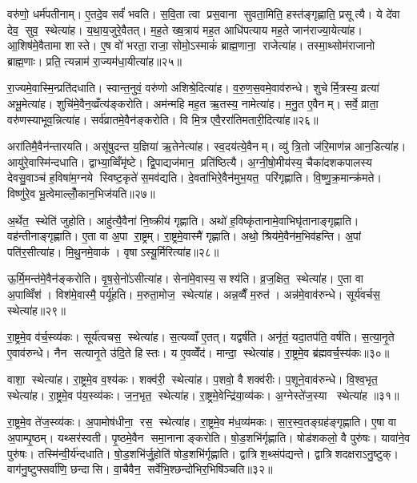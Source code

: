 वरु॑णो॒ धर्म॑पतीनाम्। ए॒तदे॒व सर्वं॑ भवति। स॒वि॒ता त्वा प्रस॒वाना सुवता॒मिति॒ हस्त॑ङ्गृह्णाति॒ प्रसूत्यै। ये दे॑वा देव॒ सुव॒ स्थेत्या॑ह। य॒था॒य॒जुरे॒वैतत्। म॒ह॒ते ख्ष॒त्राय॑ मह॒त आधि॑पत्याय मह॒ते जान॑राज्या॒येत्या॑ह। आ॒शिष॑मे॒वैतामा शास्ते। ए॒ष वो॑ भरता॒ राजा॒ सोमो॒ऽस्माकं॑ ब्राह्म॒णाना॒ राजेत्या॑ह। तस्मा॒थ्सोम॑राजानो ब्राह्म॒णाः। प्रति॒ त्यन्नाम॑ रा॒ज्यम॑धा॒यीत्या॑ह॥२५॥

रा॒ज्यमे॒वास्मि॒न्प्रति॑दधाति। स्वान्त॒नुवं॒ वरु॑णो अशिश्रे॒दित्या॑ह। व॒रु॒ण॒स॒वमे॒वाव॑रुन्धे। शुचेर्मि॒त्रस्य॒ व्रत्या॑ अभू॒मेत्या॑ह। शुचि॑मे॒वैन॒व्व्रँत्य॑ङ्करोति। अम॑न्महि मह॒त ऋ॒तस्य॒ नामेत्या॑ह। म॒नु॒त ए॒वैनम्। सर्वे॒ व्राता॒ वरु॑णस्याभूव॒न्नित्या॑ह। सर्व॑व्रातमे॒वैन॑ङ्करोति। वि मि॒त्र एवै॒ररा॑तिमतारी॒दित्या॑ह॥२६॥

अरा॑तिमै॒वैन॑न्तारयति। असू॑षुदन्त य॒ज्ञिया॑ ऋ॒तेनेत्या॑ह। स्व॒दय॑त्ये॒वैनम्। व्यु॑ त्रि॒तो ज॑रि॒माण॑न्न आन॒डित्या॑ह। आयु॑रे॒वास्मि॑न्दधाति। द्वाभ्या॒व्विँमृ॑ष्टे। द्वि॒पाद्यज॑मान॒ प्रति॑ष्ठित्यै। अ॒ग्नी॒षो॒मीय॑स्य॒ चैका॑दशकपालस्य देवसु॒वाञ्च॑ ह॒विषा॑म॒ग्नये स्विष्ट॒कृते॑ स॒मव॑द्यति। दे॒वता॑भिरे॒वैन॑मुभ॒यत॒ परि॑गृह्णाति। वि॒ष्णु॒क्र॒मान्क्र॑मते। विष्णु॑रे॒व भू॒त्वेमाल्लोँ॒कान॒भिज॑यति॥२७॥\anuvakamend[स॒त्याना॑मधा॒यीत्या॑हातारी॒दित्या॑ह क्रमत॒ एक॑ञ्च]

अ॒र्थेत॒ स्थेति॑ जुहोति। आहु॑त्यै॒वैना॑ नि॒ष्क्रीय॑ गृह्णाति। अथो॑ ह॒विष्कृ॑तानामे॒वाभिघृ॑तानाङ्गृह्णाति। वह॑न्तीनाङ्गृह्णाति। ए॒ता वा अ॒पा रा॒ष्ट्रम्। रा॒ष्ट्रमे॒वास्मै॑ गृह्णाति। अथो॒ श्रिय॑मे॒वैन॑म॒भिव॑हन्ति। अ॒पां पति॑र॒सीत्या॑ह। मि॒थु॒नमे॒वाक॑। वृषाऽस्यू॒र्मिरित्या॑ह॥२८॥

ऊ॒र्मि॒मन्त॑मे॒वैन॑ङ्करोति। वृ॒ष॒से॒नो॑ऽसीत्या॑ह। सेना॑मे॒वास्य॒ सश्य॑ति। व्र॒ज॒क्षित॒ स्थेत्या॑ह। ए॒ता वा अ॒पाव्विँश॑। विश॑मे॒वास्मै॒ पर्यू॑हति। म॒रुता॒मोज॒ स्थेत्या॑ह। अन्न॒व्वैँ म॒रुत॑। अन्न॑मे॒वाव॑रुन्धे। सूर्य॑वर्चस॒ स्थेत्या॑ह॥२९॥

रा॒ष्ट्रमे॒व व॑र्च॒स्व्य॑कः। सूर्य॑त्वचस॒ स्थेत्या॑ह। स॒त्यव्वाँ ए॒तत्। यद्वर्\mbox{}ष॑ति। अनृ॑तं॒ यदा॒तप॑ति॒ वर्\mbox{}ष॑ति। स॒त्या॒नृ॒ते ए॒वाव॑रुन्धे। नैन सत्यानृ॒ते उ॑दि॒ते हिस्तः। य ए॒वव्वेँद॑। मान्दा॒ स्थेत्या॑ह। रा॒ष्ट्रमे॒व ब्र॑ह्मवर्च॒स्य॑कः॥३०॥

वाशा॒ स्थेत्या॑ह। रा॒ष्ट्रमे॒व व॒श्य॑कः। शक्व॑री॒ स्थेत्या॑ह। प॒शवो॒ वै शक्व॑रीः। प॒शूने॒वाव॑रुन्धे। वि॒श्व॒भृत॒ स्थेत्या॑ह। रा॒ष्ट्रमे॒व प॑य॒स्व्य॑कः। ज॒न॒भृत॒ स्थेत्या॑ह। रा॒ष्ट्रमे॒वेन्द्रि॑या॒व्य॑कः। अ॒ग्नेस्ते॑ज॒स्या स्थेत्या॑ह ॥३१॥

रा॒ष्ट्रमे॒व ते॑ज॒स्व्य॑कः। अ॒पामोष॑धीना॒ रस॒ स्थेत्या॑ह। रा॒ष्ट्रमे॒व म॑ध॒व्य॑मकः। सा॒र॒स्व॒तङ्ग्रह॑ङ्गृह्णाति। ए॒षा वा अ॒पाम्पृ॒ष्ठम्। यथ्सर॑स्वती। पृ॒ष्ठमे॒वैन समा॒नानाङ्करोति। षो॒ड॒शभि॑र्गृह्णाति। षोड॑शकलो॒ वै पुरु॑षः। यावा॑ने॒व पुरु॑षः। तस्मि॑न्वी॒र्य॑न्दधाति। षो॒ड॒शभि॑र्जु॒होति॑ षोड॒शभि॑र्गृह्णाति। द्वात्रिश॒थ्संप॑द्यन्ते। द्वात्रिशदक्षराऽनु॒ष्टुक्। वाग॑नु॒ष्टुफ्सर्वा॑णि॒ छन्दासि। वा॒चैवैन॒ सर्वे॑भि॒श्छन्दो॑भिर॒भिषि॑ञ्चति॥३२॥\anuvakamend[ऊ॒र्मिरित्या॑ह॒ सूर्य॑वर्चस॒ स्थेत्या॑ह ब्रह्मवर्च॒स्य॑कस्तेज॒स्या स्थेत्या॑है॒व पुरु॑ष॒ष्षट् च॑]

